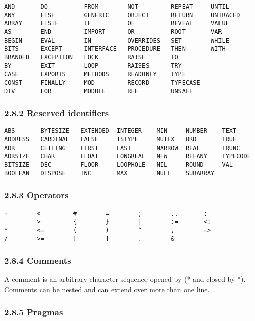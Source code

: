 \documentclass[10pt]{article}
\begin{document}
\begin{verbatim}
AND       DO          FROM        NOT         REPEAT     UNTIL
ANY       ELSE        GENERIC     OBJECT      RETURN     UNTRACED
ARRAY     ELSIF       IF          OF          REVEAL     VALUE
AS        END         IMPORT      OR          ROOT       VAR
BEGIN     EVAL        IN          OVERRIDES   SET        WHILE
BITS      EXCEPT      INTERFACE   PROCEDURE   THEN       WITH
BRANDED   EXCEPTION   LOCK        RAISE       TO
BY        EXIT        LOOP        RAISES      TRY
CASE      EXPORTS     METHODS     READONLY    TYPE
CONST     FINALLY     MOD         RECORD      TYPECASE
DIV       FOR         MODULE      REF         UNSAFE
\end{verbatim}

\subsubsection*{2.8.2 Reserved identifiers}

\begin{verbatim}
ABS       BYTESIZE   EXTENDED  INTEGER    MIN     NUMBER    TEXT
ADDRESS   CARDINAL   FALSE     ISTYPE     MUTEX   ORD       TRUE
ADR       CEILING    FIRST     LAST       NARROW  REAL      TRUNC
ADRSIZE   CHAR       FLOAT     LONGREAL   NEW     REFANY    TYPECODE
BITSIZE   DEC        FLOOR     LOOPHOLE   NIL     ROUND     VAL
BOOLEAN   DISPOSE    INC       MAX        NULL    SUBARRAY
\end{verbatim}

\subsubsection*{2.8.3 Operators}

\begin{verbatim}
+        <         #        =        ;        ..       :
-        >         {        }        |        :=       <:
*        <=        (        )        ^        ,        =>
/        >=        [        ]        .        &
\end{verbatim}

\subsubsection*{2.8.4 Comments}

A comment is an arbitrary character sequence opened by (* and closed by *).
Comments can be nested and can extend over more than one line.

\subsubsection*{2.8.5 Pragmas}
\end{document}
